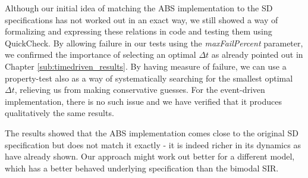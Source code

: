 Although our initial idea of matching the ABS implementation to the SD specifications has not worked out in an exact way, we still showed a way of formalizing and expressing these relations in code and testing them using QuickCheck. By allowing failure in our tests using the \textit{maxFailPercent} parameter, we confirmed the importance of selecting an optimal $\Delta t$ as already pointed out in Chapter \ref{sub:timedriven_results}. By having measure of failure, we can use a property-test also as a way of systematically searching for the smallest optimal $\Delta t$, relieving us from making conservative guesses. For the event-driven implementation, there is no such issue and we have verified that it produces qualitatively the same results.

The results showed that the ABS implementation comes close to the original SD specification but does not match it exactly - it is indeed richer in its dynamics as \cite{macal_agent-based_2010, figueredo_comparing_2014} have already shown. Our approach might work out better for a different model, which has a better behaved underlying specification than the bimodal SIR. %